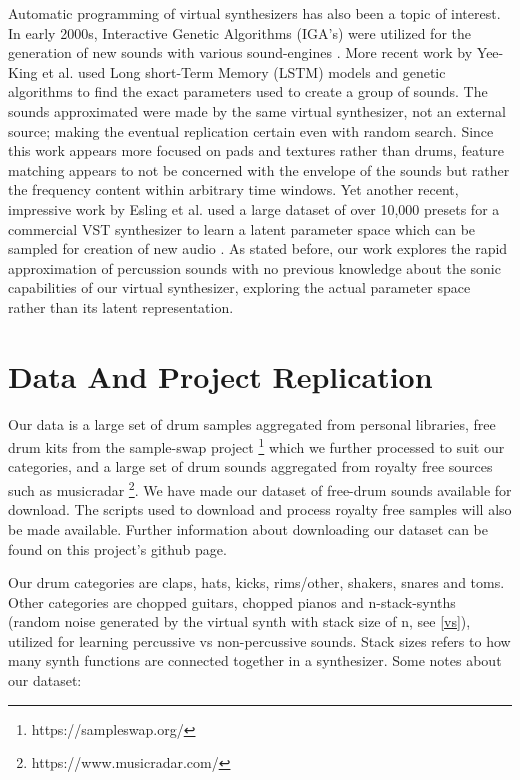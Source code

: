 \documentclass[\main/thesis.tex]{subfiles}
\begin{document}
Automatic programming of virtual synthesizers has also been a topic of interest. In early 2000s, Interactive Genetic Algorithms (IGA's) were utilized for the generation of new sounds with various sound-engines \cite{johnson1999exploring,dahlstedt2001creating}. More recent work by Yee-King et al. \cite{yee2018automatic} used Long short-Term Memory (LSTM) models and genetic algorithms to find the exact parameters used to create a group of sounds. The sounds approximated were made by the same virtual synthesizer, not an external source; making the eventual replication certain even with random search. Since this work appears more focused on pads and textures rather than drums, feature matching appears to not be concerned with the envelope of the sounds but rather the frequency content within arbitrary time windows. Yet another recent, impressive work by Esling et al. used a large dataset of over 10,000 presets for a commercial VST synthesizer to learn a latent parameter space which can be sampled for creation of new audio \cite{esling2019universal}. As stated before, our work explores the rapid approximation of percussion sounds with no previous knowledge about the sonic capabilities of our virtual synthesizer, exploring the actual parameter space rather than its latent representation. 



\section{Data And Project Replication}
\label{data}

Our data is a large set of drum samples aggregated from personal libraries, free drum kits from the sample-swap project \footnote{https://sampleswap.org/} which we further processed to suit our categories, and a large set of drum sounds aggregated from royalty free sources such as musicradar \footnote{https://www.musicradar.com/}. We have made our dataset of free-drum sounds available for download. The scripts used to download and process royalty free samples will also be made available. Further information about downloading our dataset can be found on this project's github page. 

Our drum categories are claps, hats, kicks, rims/other, shakers, snares and toms. Other categories are chopped guitars, chopped pianos and n-stack-synths (random noise generated by the virtual synth with stack size of n, see \ref{vs}), utilized for learning percussive vs non-percussive sounds. Stack sizes refers to how many synth functions are connected together in a synthesizer.
Some notes about our dataset:
\end{document}
